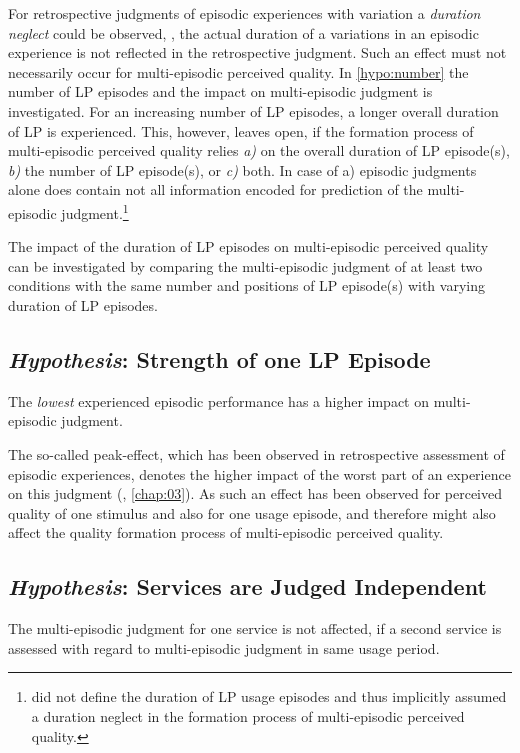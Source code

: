 For retrospective judgments of episodic experiences with variation a \emph{duration neglect} could be observed, \ie, the actual duration of a variations in an episodic experience is not reflected in the retrospective judgment.
Such an effect must not necessarily occur for multi-episodic perceived quality.
In \autoref{hypo:number} the number of \ac{LP} episodes and the impact on multi-episodic judgment is investigated.
For an increasing number of \ac{LP} episodes, a longer overall duration of \ac{LP} is experienced.
This, however, leaves open, if the formation process of multi-episodic perceived quality relies \emph{a)} on the overall duration of \ac{LP} episode(s), \emph{b)} the number of \ac{LP} episode(s), or \emph{c)} both.
In case of a) episodic judgments alone does contain not all information encoded for prediction of the multi-episodic judgment.\footnote{\cite[p. 2]{moller_single-call_2011} did not define the duration of \ac{LP} usage episodes and thus implicitly assumed a duration neglect in the formation process of multi-episodic perceived quality.}

The impact of the duration of \ac{LP} episodes on multi-episodic perceived quality can be investigated by comparing the multi-episodic judgment of at least two conditions with the same number and positions of \ac{LP} episode(s) with varying duration of \ac{LP} episodes.


\subsection{\emph{Hypothesis}: Strength of one \ac{LP} Episode}
\begin{hypothesis}\label{hypo:strength}
The \emph{lowest} experienced episodic performance has a higher impact on multi-episodic judgment.
\end{hypothesis}

The so-called peak-effect, which has been observed in retrospective assessment of episodic experiences, denotes the higher impact of the worst part of an experience on this judgment (\cf, \autoref{chap:03}).
As such an effect has been observed for perceived quality of one stimulus and also for one usage episode, and therefore might also affect the quality formation process of multi-episodic perceived quality.

\subsection{\emph{Hypothesis}: Services are Judged Independent}
\begin{hypothesis}\label{hypo:independent}
The multi-episodic judgment for one service is not affected, if a second service is assessed with regard to multi-episodic judgment in same usage period.
\end{hypothesis}

